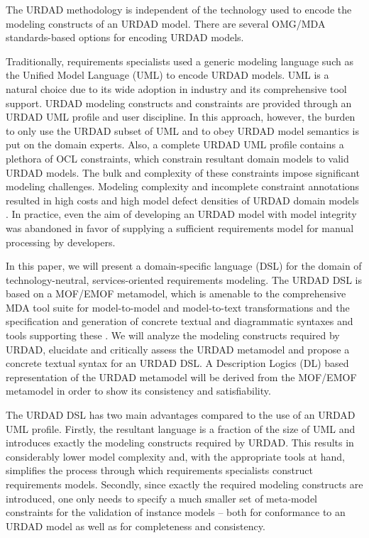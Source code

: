 The URDAD methodology is independent of the technology used to encode the modeling constructs of an URDAD model. There are several OMG/MDA standards-based options for encoding URDAD models.

Traditionally, requirements specialists used a generic modeling language such as the Unified Model Language (UML) to encode URDAD models. UML is a natural choice due to its wide adoption in industry and its comprehensive tool support. URDAD modeling constructs and constraints are provided through an URDAD UML profile and user discipline. In this approach, however, the burden to only use the URDAD subset of UML and to obey URDAD model semantics is put on the domain experts. Also, a complete URDAD UML profile contains a plethora of OCL constraints, which constrain resultant domain models to valid URDAD models. The bulk and complexity of these constraints impose significant modeling challenges. Modeling complexity and incomplete constraint annotations resulted in high costs and high model defect densities of URDAD domain models \cite{}. In practice, even the aim of developing an URDAD model with model integrity was abandoned in favor of supplying a sufficient requirements model for manual processing by developers.

In this paper, we will present a domain-specific language (DSL) for the domain of technology-neutral, services-oriented requirements modeling. The URDAD DSL is based on a MOF/EMOF metamodel, which is amenable to the comprehensive MDA tool suite for model-to-model and model-to-text transformations and the specification and generation of concrete textual and diagrammatic syntaxes and tools supporting these \cite{gronback_model_2008}. We will analyze the modeling constructs required by URDAD, elucidate and critically assess the URDAD metamodel and propose a concrete textual syntax for an URDAD DSL. A Description Logics (DL) based representation of the URDAD metamodel will be derived from the MOF/EMOF metamodel in order to show its consistency and satisfiability.

The URDAD DSL has two main advantages compared to the use of an URDAD UML profile. Firstly, the resultant language is a fraction of the size of UML and introduces exactly the modeling constructs required by URDAD. This results in considerably lower model complexity and, with the appropriate tools at hand, simplifies the process through which requirements specialists construct requirements models. Secondly, since exactly the required modeling constructs are introduced, one only needs to specify a much smaller set of  meta-model constraints for the validation of instance models -- both for conformance to an URDAD model as well as for completeness and consistency.

